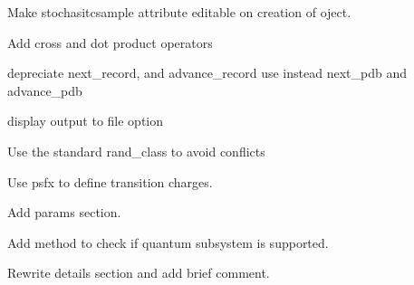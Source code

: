 
\begin{DoxyRefList}
\item[\label{todo__todo000001}%
\hypertarget{todo__todo000001}{}%
Type \hyperlink{classharmonicbath__class}{harmonicbath\-\_\-class} ]Make stochasitcsample attribute editable on creation of oject.  
\item[\label{todo__todo000008}%
\hypertarget{todo__todo000008}{}%
Type \hyperlink{classmath}{math} ]
\begin{DoxyItemize}
\item Add cross and dot product operators  
\end{DoxyItemize}
\item[\label{todo__todo000002}%
\hypertarget{todo__todo000002}{}%
Type \hyperlink{classmolreader}{molreader} ]depreciate next\-\_\-record, and advance\-\_\-record use instead next\-\_\-pdb and advance\-\_\-pdb  
\item[\label{todo__todo000003}%
\hypertarget{todo__todo000003}{}%
Type \hyperlink{classpldm__class}{pldm\-\_\-class} ]
\begin{DoxyItemize}
\item display output to file option  
\end{DoxyItemize}
\item[\label{todo__todo000004}%
\hypertarget{todo__todo000004}{}%
Subprogram \hyperlink{praxis_8f_a08308a29605c2abb57b179777553e9e1}{ran0} (idum)]Use the standard rand\-\_\-class to avoid conflicts  
\item[\label{todo__todo000007}%
\hypertarget{todo__todo000007}{}%
Subprogram \hyperlink{classspectrometer__class_af1fc802879075c7e5e42ef4baac69445}{spectrometer\-\_\-class\-:\-:get\-\_\-abpdbspectrum} (this, qs, file, pdb, psf, psfx, atm\-\_\-select, dipole\-\_\-to, dipole\-\_\-from, dipole\-\_\-center)]
\begin{DoxyItemize}
\item Use psfx to define transition charges.
\item Add params section.  
\end{DoxyItemize}
\item[\label{todo__todo000005}%
\hypertarget{todo__todo000005}{}%
Subprogram \hyperlink{classspectrometer__class_ad2c4936524c8702e1c4e53a54a043f31}{spectrometer\-\_\-class\-:\-:get\-\_\-abspectrum} (this, qs, cs, cp, tol, samples, file)]
\begin{DoxyItemize}
\item Add method to check if quantum subsystem is supported.
\item Rewrite details section and add brief comment. 
\end{DoxyItemize}
\end{DoxyRefList}